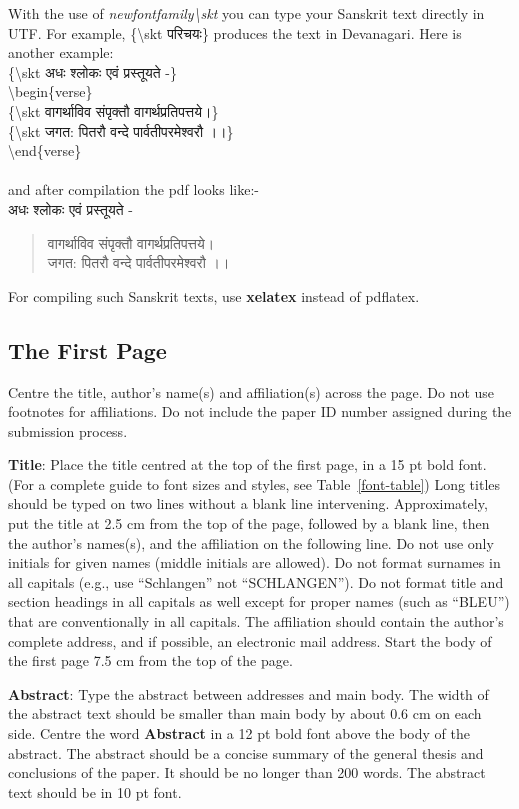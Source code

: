 \documentclass[11pt]{article}
\begin{document}
With the use of {\it newfontfamily\textbackslash skt} you can type your Sanskrit text directly in UTF.
For example, \{\textbackslash skt परिचयः\} produces the text in Devanagari. Here is another example:\\
\{\textbackslash skt अधः श्लोकः एवं प्रस्तूयते -\}\\
\textbackslash begin\{verse\}\\
\{\textbackslash skt वागर्थाविव संपृक्तौ वागर्थप्रतिपत्तये।\}\\
\{\textbackslash skt जगत: पितरौ वन्दे पार्वतीपरमेश्वरौ ।।\}\\
\textbackslash end\{verse\}\\\\
and after compilation the pdf looks like:- \\
{अधः श्लोकः एवं प्रस्तूयते -}
\begin{verse}
{वागर्थाविव संपृक्तौ वागर्थप्रतिपत्तये।}\\
{जगत: पितरौ वन्दे पार्वतीपरमेश्वरौ ।।}
\end{verse}
For compiling such Sanskrit texts, use {\bf xelatex} instead of pdflatex.

\subsection{The First Page}
\label{ssec:first}

Centre the title, author's name(s) and affiliation(s) across
the page.
Do not use footnotes for affiliations. Do not include the
paper ID number assigned during the submission process.

{\bf Title}: Place the title centred at the top of the first page, in
a 15 pt bold font. (For a complete guide to font sizes and styles,
see Table~\ref{font-table}) Long titles should be typed on two lines
without a blank line intervening. Approximately, put the title at 2.5
cm from the top of the page, followed by a blank line, then the
author's names(s), and the affiliation on the following line. Do not
use only initials for given names (middle initials are allowed). Do
not format surnames in all capitals (e.g., use ``Schlangen'' not
``SCHLANGEN'').  Do not format title and section headings in all
capitals as well except for proper names (such as ``BLEU'') that are
conventionally in all capitals.  The affiliation should contain the
author's complete address, and if possible, an electronic mail
address. Start the body of the first page 7.5 cm from the top of the
page.

{\bf Abstract}: Type the abstract between addresses and main body.
The width of the abstract text should be
smaller than main body by about 0.6 cm on each side.
Centre the word {\bf Abstract} in a 12 pt bold
font above the body of the abstract. The abstract should be a concise
summary of the general thesis and conclusions of the paper. It should
be no longer than 200 words. The abstract text should be in 10 pt font.
\end{document}
